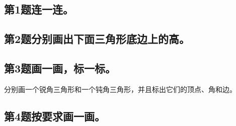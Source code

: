 \subsection*{第1题\quad 连一连。}
\subsection*{第2题\quad 分别画出下面三角形底边上的高。}
\subsection*{第3题\quad 画一画，标一标。}
\noindent 分别画一个锐角三角形和一个钝角三角形，并且标出它们的顶点、角和边。\par
{}
\subsection*{第4题\quad 按要求画一画。}
